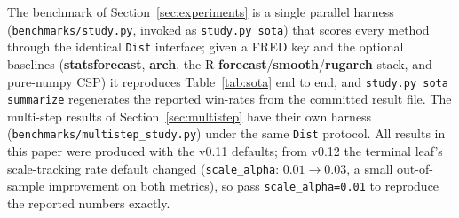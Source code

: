 \documentclass[article]{jss}
\providecommand{\proglang}[1]{\textsf{#1}}
\providecommand{\pkg}[1]{\textbf{#1}}
\providecommand{\code}[1]{\texttt{#1}}
\begin{document}
The benchmark of Section~\ref{sec:experiments} is a single parallel harness
(\code{benchmarks/study.py}, invoked as \code{study.py sota}) that scores every
method through the identical \code{Dist} interface; given a \proglang{FRED} key
and the optional baselines (\pkg{statsforecast}, \pkg{arch}, the \proglang{R}
\pkg{forecast}/\pkg{smooth}/\pkg{rugarch} stack, and pure-\proglang{numpy} CSP) it
reproduces Table~\ref{tab:sota} end to end, and
\code{study.py sota summarize} regenerates the reported win-rates from the
committed result file. The multi-step results of Section~\ref{sec:multistep} have
their own harness (\code{benchmarks/multistep\_study.py}) under the same
\code{Dist} protocol. All results in this paper were produced with the
v0.11 defaults; from v0.12 the terminal leaf's scale-tracking rate default
changed (\code{scale\_alpha}: $0.01 \to 0.03$, a small out-of-sample
improvement on both metrics), so pass \code{scale\_alpha=0.01} to reproduce
the reported numbers exactly.



\end{document}
